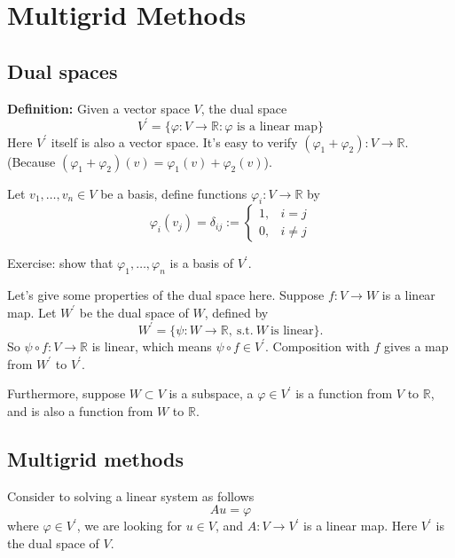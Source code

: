 \section{Multigrid Methods } %


\subsection{Dual spaces}
{\bf Definition:} Given a vector space $V$, the dual space 
$$V^\prime = \{\varphi: V \to \mathbb{R}: \varphi\textrm{ is a linear map}\}$$
Here $V^\prime$ itself is  also a vector space. It's easy to verify $(\varphi_1+\varphi_2): V\to \mathbb{R}$. (Because $(\varphi_1+\varphi_2)(v)=\varphi_1(v)+\varphi_2(v)$). 

Let $v_1,\ldots,v_n \in V$ be a basis, define functions $\varphi_i: V\to\mathbb{R}$ by 
\begin{equation}
\varphi_i (v_j) = \delta_{ij} := \left\{
	\begin{array}{cc}
	1, & i=j \\
	0, & i\ne j
	\end{array} \right.
\end{equation}

Exercise: show that $\varphi_1, \ldots, \varphi_n$ is a basis of $V^\prime$.

Let's give some properties of the dual space here.
Suppose $f: V \to W$ is a linear map. Let $W^\prime$ be the dual space of $W$, defined by
\begin{equation}
W^\prime = \{ \psi: W\to \mathbb{R},\ \textrm{s.t.}\ W\ \textrm{is linear} \}.
\end{equation}  
So $\psi \circ f: V\to \mathbb{R}$ is linear, which means $\psi \circ f \in V^\prime$.
Composition with $f$ gives a map from $W^\prime$ to $V^\prime$. %

Furthermore, suppose $W\subset V$ is a subspace, a $\varphi \in V^\prime$ is a function from $V$ to $\mathbb{R}$, and is also a function from $W$ to $\mathbb{R}$.  


\subsection{Multigrid methods}
Consider to solving a linear system as follows
\begin{equation}\label{eq:linearsys}
A u = \varphi
\end{equation}
where $\varphi\in V^{\prime}$, we are looking for $u\in V$, and  $A: V\to V^{\prime}$ is a linear map. Here $V^{\prime}$ is the dual space of $V$. 

